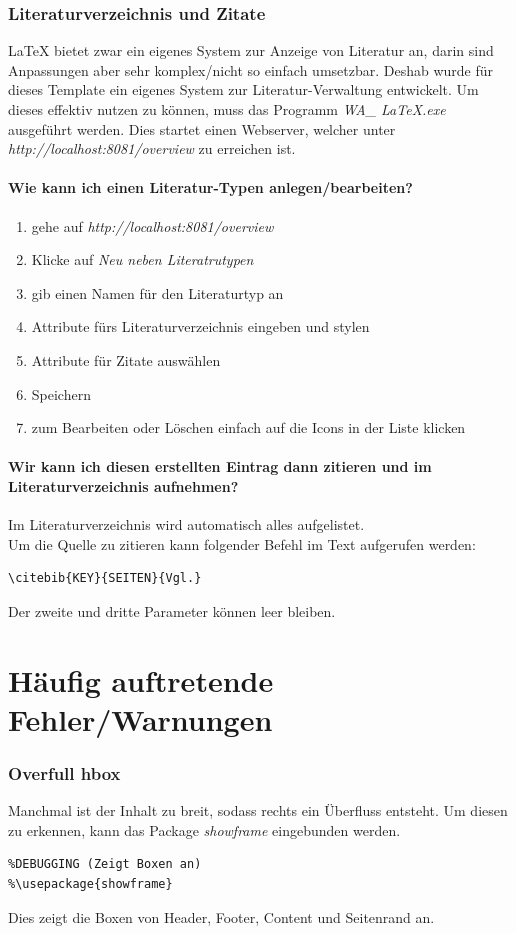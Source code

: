 \documentclass[12pt]{article}
\begin{document}
\section{Literaturverzeichnis und Zitate}
LaTeX bietet zwar ein eigenes System zur Anzeige von Literatur an, darin sind Anpassungen aber sehr komplex/nicht so einfach umsetzbar. Deshab wurde für dieses Template ein eigenes System zur Literatur-Verwaltung entwickelt. Um dieses effektiv nutzen zu können, muss das Programm \textit{WA\_ LaTeX.exe} ausgeführt werden. Dies startet einen Webserver, welcher unter \textit{http://localhost:8081/overview} zu erreichen ist.

\subsection{Wie kann ich einen Literatur-Typen anlegen/bearbeiten?}
\begin{enumerate}
\item gehe auf \textit{http://localhost:8081/overview}
\item Klicke auf \textit{Neu neben Literatrutypen}
\item gib einen Namen für den Literaturtyp an
\item Attribute fürs Literaturverzeichnis eingeben und stylen
\item Attribute für Zitate auswählen
\item Speichern
\item zum Bearbeiten oder Löschen einfach auf die Icons in der Liste klicken
\end{enumerate}

\subsection{Wir kann ich diesen erstellten Eintrag dann zitieren und im Literaturverzeichnis aufnehmen?}
Im Literaturverzeichnis wird automatisch alles aufgelistet.\\[6pt]Um die Quelle zu zitieren kann folgender Befehl im Text aufgerufen werden:
\begin{verbatim}
\citebib{KEY}{SEITEN}{Vgl.}
\end{verbatim}
Der zweite und dritte Parameter können leer bleiben.

\part{Häufig auftretende Fehler/Warnungen}
\section{Overfull hbox}
Manchmal ist der Inhalt zu breit, sodass rechts ein Überfluss entsteht. Um diesen zu erkennen, kann das Package \textit{showframe}  eingebunden werden.
\begin{verbatim}
%DEBUGGING (Zeigt Boxen an)
%\usepackage{showframe}
\end{verbatim}
Dies zeigt die Boxen von Header, Footer, Content und Seitenrand an.
\end{document}
